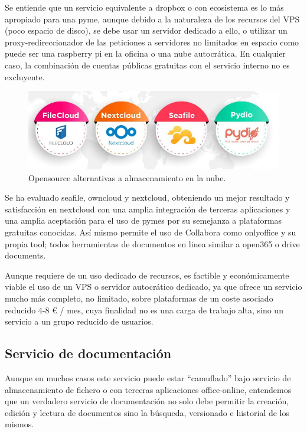 Se entiende que un servicio equivalente a dropbox o con ecosistema es lo más apropiado para una pyme, aunque debido a la naturaleza de los recursos del VPS (poco espacio de disco), se debe usar un servidor dedicado a ello, o utilizar un proxy-redireccionador de las peticiones a servidores no limitados en espacio como puede ser una raspberry pi en la oficina o una nube autocrática. En cualquier caso, la combinación de cuentas públicas gratuitas con el servicio interno no es excluyente.

\begin{figure}[!htb]
\begin{center}
\includegraphics[width=1\textwidth]{./figuras/cloud_storage.jpg}
\caption{Opensource alternativas a almacenamiento en la nube.}
\label{F:cloud_storage}
\end{center}
\end{figure}

Se ha evaluado seafile\cite{c_seafile}, owncloud\cite{c_owncloud} y nextcloud\cite{c_nextcloud}, obteniendo un mejor resultado y satisfacción en nextcloud con una amplia integración de terceras aplicaciones y una amplia aceptación para el uso de pymes por su semejanza a plataformas gratuitas conocidas. Así mismo permite el uso de Collabora\cite{c_colabora} como onlyoffice\cite{c_onlyoffice} y su propia tool; todos herramientas de documentos en linea similar a open365 o drive documents.

Aunque requiere de un uso dedicado de recursos, es factible y económicamente viable el uso de un VPS o servidor autocrático dedicado, ya que ofrece un servicio mucho más completo, no limitado, sobre plataformas de un coste asociado reducido 4-8 € / mes, cuya finalidad no es una carga de trabajo alta, sino un servicio a un grupo reducido de usuarios.

\subsection{Servicio de documentación}
Aunque en muchos casos este servicio puede estar “camuflado” bajo servicio de almacenamiento de fichero o con terceras aplicaciones office-online, entendemos que un verdadero servicio de documentación no solo debe permitir la creación, edición y lectura de documentos sino la búsqueda, versionado e historial de los mismos.

